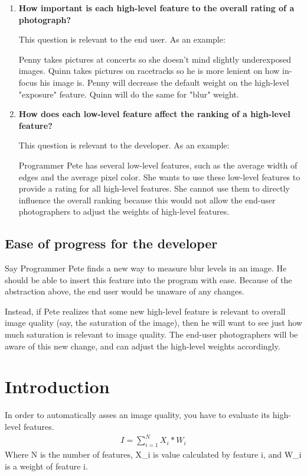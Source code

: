 \documentclass[10pt,twocolumn]{article}
\begin{document}
\begin{enumerate}
\item \textbf{How important is each high-level feature to the overall rating of a photograph?}

This question is relevant to the end user. As an example:

Penny takes pictures at concerts so she doesn't mind slightly underexposed images. Quinn takes pictures on racetracks so he is more lenient on how in-focus his image is. Penny will decrease the default weight on the high-level "exposure" feature. Quinn will do the same for "blur" weight.

\item \textbf{How does each low-level feature affect the ranking of a high-level feature?}

This  question is relevant to the developer. As an example:

Programmer Pete has several low-level features, such as the average width of edges and the average pixel color. She wants to use these low-level features to provide a rating for all high-level features. She cannot use them to directly influence the overall ranking because this would not allow the end-user photographers to adjust the weights of high-level features.
\end{enumerate}

\subsection{Ease of progress for the developer}
Say Programmer Pete finds a new way to measure blur levels in an image. He should be able to insert this feature into the program with ease. Because of the abstraction above, the end user would be unaware of any changes.

Instead, if Pete realizes that some new high-level feature is relevant to overall image quality (say, the saturation of the image), then he will want to see just how much saturation is relevant to image quality. The end-user photographers will be aware of this new change, and can adjust the high-level weights accordingly.

\section{Introduction}
In order to automatically asses an image quality, you have to 
evaluate its high-level features. %
\begin{eqnarray}
I=\sum_{i=1}^N X_i*W_i
\end{eqnarray}
Where N is the number of features, X_i is value calculated by 
feature i, and W_i is a weight of feature i.
\end{document}
